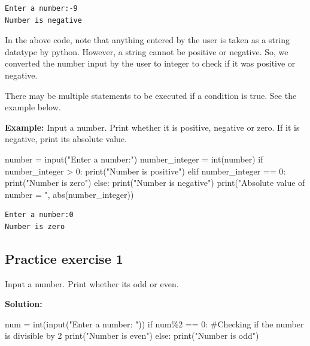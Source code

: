 \documentclass[
  letterpaper,
  DIV=11,
  numbers=noendperiod]{scrreprt}
\newenvironment{Shaded}{\begin{snugshade}}{\end{snugshade}}
\newcommand{\BuiltInTok}[1]{\textcolor[rgb]{0.00,0.23,0.31}{#1}}
\newcommand{\CommentTok}[1]{\textcolor[rgb]{0.37,0.37,0.37}{#1}}
\newcommand{\ControlFlowTok}[1]{\textcolor[rgb]{0.00,0.23,0.31}{#1}}
\newcommand{\DecValTok}[1]{\textcolor[rgb]{0.68,0.00,0.00}{#1}}
\newcommand{\NormalTok}[1]{\textcolor[rgb]{0.00,0.23,0.31}{#1}}
\newcommand{\OperatorTok}[1]{\textcolor[rgb]{0.37,0.37,0.37}{#1}}
\newcommand{\StringTok}[1]{\textcolor[rgb]{0.13,0.47,0.30}{#1}}
\begin{document}
\begin{verbatim}
Enter a number:-9
Number is negative
\end{verbatim}

In the above code, note that anything entered by the user is taken as a
string datatype by python. However, a string cannot be positive or
negative. So, we converted the number input by the user to integer to
check if it was positive or negative.

There may be multiple statements to be executed if a condition is true.
See the example below.

\textbf{Example:} Input a number. Print whether it is positive, negative
or zero. If it is negative, print its absolute value.

\begin{Shaded}
\begin{Highlighting}[]
\NormalTok{number }\OperatorTok{=} \BuiltInTok{input}\NormalTok{(}\StringTok{"Enter a number:"}\NormalTok{)}
\NormalTok{number\_integer }\OperatorTok{=} \BuiltInTok{int}\NormalTok{(number)}
\ControlFlowTok{if}\NormalTok{ number\_integer }\OperatorTok{\textgreater{}} \DecValTok{0}\NormalTok{:}
    \BuiltInTok{print}\NormalTok{(}\StringTok{"Number is positive"}\NormalTok{)}
\ControlFlowTok{elif}\NormalTok{ number\_integer }\OperatorTok{==} \DecValTok{0}\NormalTok{:}
    \BuiltInTok{print}\NormalTok{(}\StringTok{"Number is zero"}\NormalTok{)}
\ControlFlowTok{else}\NormalTok{:}
    \BuiltInTok{print}\NormalTok{(}\StringTok{"Number is negative"}\NormalTok{)}
    \BuiltInTok{print}\NormalTok{(}\StringTok{"Absolute value of number = "}\NormalTok{, }\BuiltInTok{abs}\NormalTok{(number\_integer))}
\end{Highlighting}
\end{Shaded}

\begin{verbatim}
Enter a number:0
Number is zero
\end{verbatim}

\hypertarget{practice-exercise-1-1}{%
\subsection{Practice exercise 1}\label{practice-exercise-1-1}}

Input a number. Print whether its odd or even.

\textbf{Solution:}

\begin{Shaded}
\begin{Highlighting}[]
\NormalTok{num }\OperatorTok{=} \BuiltInTok{int}\NormalTok{(}\BuiltInTok{input}\NormalTok{(}\StringTok{"Enter a number: "}\NormalTok{))}
\ControlFlowTok{if}\NormalTok{ num}\OperatorTok{\%}\DecValTok{2} \OperatorTok{==} \DecValTok{0}\NormalTok{:           }\CommentTok{\#Checking if the number is divisible by 2}
    \BuiltInTok{print}\NormalTok{(}\StringTok{"Number is even"}\NormalTok{)}
\ControlFlowTok{else}\NormalTok{:}
    \BuiltInTok{print}\NormalTok{(}\StringTok{"Number is odd"}\NormalTok{)}
\end{Highlighting}
\end{Shaded}
\end{document}
